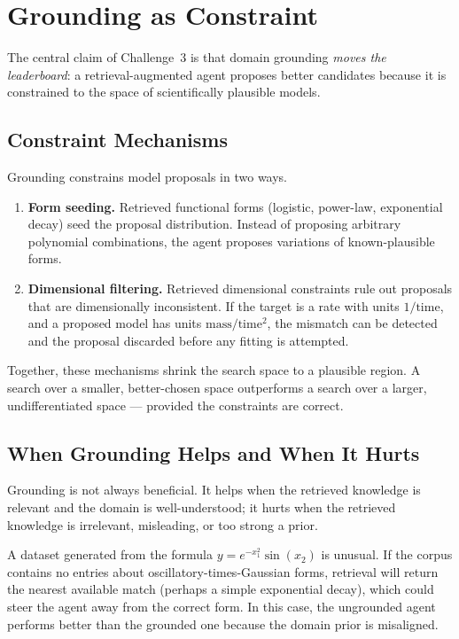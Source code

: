 \section{Grounding as Constraint}
\label{section:GroundingConstraint}

The central claim of Challenge~3 is that domain grounding \emph{moves the leaderboard}: a retrieval-augmented agent proposes better candidates because it is constrained to the space of scientifically plausible models.

\subsection{Constraint Mechanisms}

Grounding constrains model proposals in two ways.

\begin{enumerate}
\item \textbf{Form seeding.} Retrieved functional forms (logistic, power-law, exponential decay) seed the proposal distribution.
Instead of proposing arbitrary polynomial combinations, the agent proposes variations of known-plausible forms.

\item \textbf{Dimensional filtering.} Retrieved dimensional constraints rule out proposals that are dimensionally inconsistent.
If the target is a rate with units $1/\text{time}$, and a proposed model has units $\text{mass}/\text{time}^2$, the mismatch can be detected and the proposal discarded before any fitting is attempted.
\end{enumerate}

Together, these mechanisms shrink the search space to a plausible region.
A search over a smaller, better-chosen space outperforms a search over a larger, undifferentiated space — provided the constraints are correct.

\subsection{When Grounding Helps and When It Hurts}

Grounding is not always beneficial.
It helps when the retrieved knowledge is relevant and the domain is well-understood; it hurts when the retrieved knowledge is irrelevant, misleading, or too strong a prior.

\begin{example}
A dataset generated from the formula $y = e^{-x_1^2} \sin(x_2)$ is unusual.
If the corpus contains no entries about oscillatory-times-Gaussian forms, retrieval will return the nearest available match (perhaps a simple exponential decay), which could steer the agent away from the correct form.
In this case, the ungrounded agent performs better than the grounded one because the domain prior is misaligned.
\end{example}

